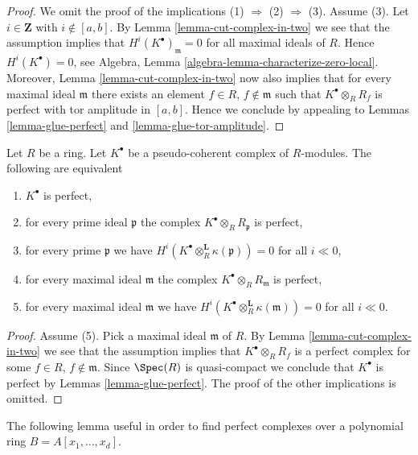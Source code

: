 \begin{proof}
We omit the proof of the implications (1) $\Rightarrow$ (2) $\Rightarrow$ (3).
Assume (3). Let $i \in \mathbf{Z}$ with $i \not \in [a, b]$. By
Lemma \ref{lemma-cut-complex-in-two}
we see that the assumption implies that $H^i(K^\bullet)_{\mathfrak m} = 0$
for all maximal ideals of $R$. Hence $H^i(K^\bullet) = 0$, see
Algebra, Lemma \ref{algebra-lemma-characterize-zero-local}.
Moreover,
Lemma \ref{lemma-cut-complex-in-two}
now also implies that for every maximal ideal
$\mathfrak m$ there exists an element $f \in R$, $f \not \in \mathfrak m$
such that $K^\bullet \otimes_R R_f$ is perfect with tor amplitude in
$[a, b]$. Hence we conclude by appealing to
Lemmas \ref{lemma-glue-perfect} and \ref{lemma-glue-tor-amplitude}.
\end{proof}

\begin{lemma}
\label{lemma-check-perfect-stalks}
Let $R$ be a ring. Let $K^\bullet$ be a pseudo-coherent
complex of $R$-modules. The following are equivalent
\begin{enumerate}
\item $K^\bullet$ is perfect,
\item for every prime ideal $\mathfrak p$ the complex
$K^\bullet \otimes_R R_{\mathfrak p}$ is perfect,
\item for every prime $\mathfrak p$ we have
$H^i(K^\bullet \otimes_R^{\mathbf{L}} \kappa(\mathfrak p)) = 0$ for all
$i \ll 0$,
\item for every maximal ideal $\mathfrak m$ the complex
$K^\bullet \otimes_R R_{\mathfrak m}$ is perfect,
\item for every maximal ideal $\mathfrak m$ we have
$H^i(K^\bullet \otimes_R^{\mathbf{L}} \kappa(\mathfrak m)) = 0$ for all
$i \ll 0$.
\end{enumerate}
\end{lemma}

\begin{proof}
Assume (5). Pick a maximal ideal $\mathfrak m$ of $R$. By
Lemma \ref{lemma-cut-complex-in-two}
we see that the assumption implies that $K^\bullet \otimes_R R_f$
is a perfect complex for some $f \in R$, $f \not \in \mathfrak m$.
Since $\Spec(R)$ is quasi-compact we conclude that $K^\bullet$
is perfect by
Lemmas \ref{lemma-glue-perfect}.
The proof of the other implications is omitted.
\end{proof}

\noindent
The following lemma useful in order to find perfect complexes
over a polynomial ring $B = A[x_1, \ldots, x_d]$.

